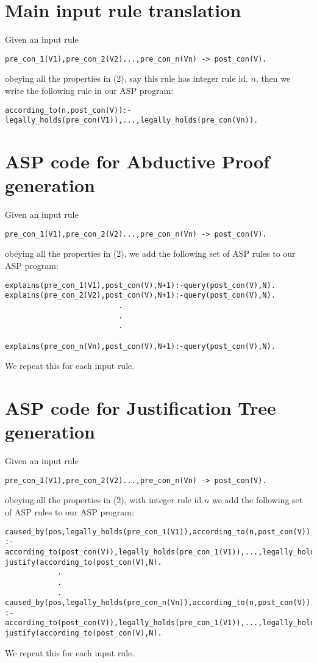 \documentclass{article}
\begin{document}
\section{Main input rule translation}
Given an input rule \begin{verbatim}
pre_con_1(V1),pre_con_2(V2)...,pre_con_n(Vn) -> post_con(V).
\end{verbatim} obeying all the properties in (2), say this rule has integer rule id. $n$, then we write the following rule in our ASP program: \begin{verbatim}
according_to(n,post_con(V)):-legally_holds(pre_con(V1)),...,legally_holds(pre_con(Vn)).    
\end{verbatim} 
\section{ASP code for Abductive Proof generation}
Given an input rule \begin{verbatim}
pre_con_1(V1),pre_con_2(V2)...,pre_con_n(Vn) -> post_con(V).
\end{verbatim} obeying all the properties in (2), we add the following set of ASP rules to our ASP program: \begin{verbatim}
explains(pre_con_1(V1),post_con(V),N+1):-query(post_con(V),N).
explains(pre_con_2(V2),post_con(V),N+1):-query(post_con(V),N).
                          .
                          .
                          .
                        
explains(pre_con_n(Vn),post_con(V),N+1):-query(post_con(V),N).
\end{verbatim}
We repeat this for each input rule. 
\section{ASP code for Justification Tree generation}
Given an input rule \begin{verbatim}
pre_con_1(V1),pre_con_2(V2)...,pre_con_n(Vn) -> post_con(V).
\end{verbatim} obeying all the properties in (2), with integer rule id $n$ we add the following set of ASP rules to our ASP program:\begin{verbatim}
caused_by(pos,legally_holds(pre_con_1(V1)),according_to(n,post_con(V)),N+1)
:-according_to(post_con(V)),legally_holds(pre_con_1(V1)),...,legally_holds(pre_con_n(Vn)),
justify(according_to(post_con(V),N).  
            .
            .
            .
caused_by(pos,legally_holds(pre_con_n(Vn)),according_to(n,post_con(V)),N+1)
:-according_to(post_con(V)),legally_holds(pre_con_1(V1)),...,legally_holds(pre_con_n(Vn)),
justify(according_to(post_con(V),N).             
\end{verbatim}
We repeat this for each input rule. 
\end{document}
